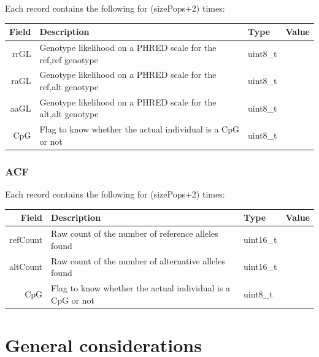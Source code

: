 \documentclass[a4paper]{article}
\begin{document}
\noindent Each record contains the following for (sizePops+2) times:

\noindent \begin{tabular}{|r|p{6cm}|l|l|}
\hline
{\bf Field} & {\bf Description} & {\bf Type} & {\bf Value} \\
\hline
rrGL & Genotype likelihood on a PHRED scale for the ref,ref genotype & uint8\_t &  \\
\hline
raGL & Genotype likelihood on a PHRED scale for the ref,alt genotype & uint8\_t &  \\
\hline
aaGL & Genotype likelihood on a PHRED scale for the alt,alt genotype & uint8\_t &  \\
\hline
CpG & Flag to know whether the actual individual is a CpG or not & uint8\_t &  \\
\hline
\end{tabular}


\clearpage



\subsubsection{ACF}

\noindent Each record contains the following for (sizePops+2) times:

\noindent \begin{tabular}{|r|p{6cm}|l|l|}
\hline
{\bf Field} & {\bf Description} & {\bf Type} & {\bf Value} \\
\hline
refCount & Raw count of the number of reference alleles found & uint16\_t &  \\
\hline
altCount & Raw count of the number of alternative alleles found & uint16\_t &  \\
\hline
CpG & Flag to know whether the actual individual is a CpG or not & uint8\_t &  \\
\hline
\end{tabular}




\newpage
\section{General considerations}
\end{document}
